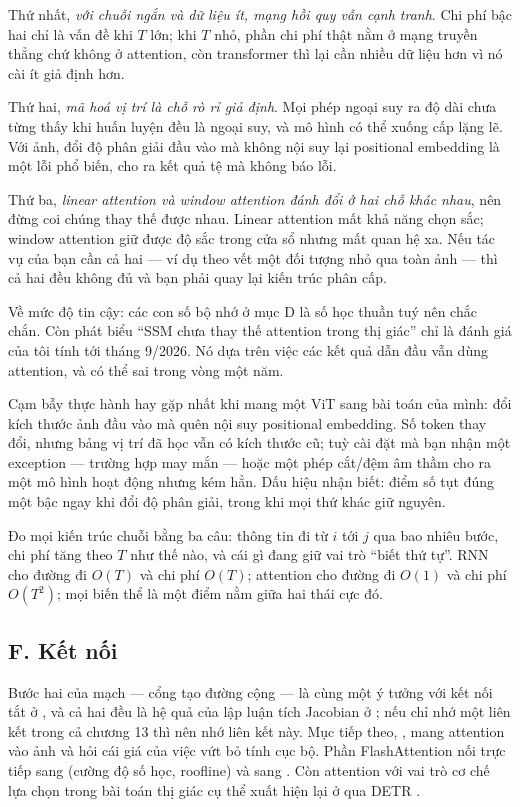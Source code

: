 \documentclass[../../../deep_learning.tex]{subfiles}
\begin{document}
Thứ nhất, \emph{với chuỗi ngắn và dữ liệu ít, mạng hồi quy vẫn cạnh tranh}. Chi phí bậc hai chỉ là vấn đề khi \(T\) lớn; khi \(T\) nhỏ, phần chi phí thật nằm ở mạng truyền thẳng chứ không ở attention, còn transformer thì lại cần nhiều dữ liệu hơn vì nó cài ít giả định hơn.

Thứ hai, \emph{mã hoá vị trí là chỗ rò rỉ giả định}. Mọi phép ngoại suy ra độ dài chưa từng thấy khi huấn luyện đều là ngoại suy, và mô hình có thể xuống cấp lặng lẽ. Với ảnh, đổi độ phân giải đầu vào mà không nội suy lại positional embedding là một lỗi phổ biến, cho ra kết quả tệ mà không báo lỗi.

Thứ ba, \emph{linear attention và window attention đánh đổi ở hai chỗ khác nhau}, nên đừng coi chúng thay thế được nhau. Linear attention mất khả năng chọn sắc; window attention giữ được độ sắc trong cửa sổ nhưng mất quan hệ xa. Nếu tác vụ của bạn cần cả hai --- ví dụ theo vết một đối tượng nhỏ qua toàn ảnh --- thì cả hai đều không đủ và bạn phải quay lại kiến trúc phân cấp.

Về mức độ tin cậy: các con số bộ nhớ ở mục D là số học thuần tuý nên chắc chắn. Còn phát biểu ``SSM chưa thay thế attention trong thị giác'' chỉ là đánh giá của tôi tính tới tháng 9/2026. Nó dựa trên việc các kết quả dẫn đầu vẫn dùng attention, và có thể sai trong vòng một năm.

\begin{cambay}
Cạm bẫy thực hành hay gặp nhất khi mang một ViT sang bài toán của mình: đổi kích thước ảnh đầu vào mà quên nội suy positional embedding. Số token thay đổi, nhưng bảng vị trí đã học vẫn có kích thước cũ; tuỳ cài đặt mà bạn nhận một exception --- trường hợp may mắn --- hoặc một phép cắt/đệm âm thầm cho ra một mô hình hoạt động nhưng kém hẳn. Dấu hiệu nhận biết: điểm số tụt đúng một bậc ngay khi đổi độ phân giải, trong khi mọi thứ khác giữ nguyên.
\end{cambay}

\begin{cannho}
Đo mọi kiến trúc chuỗi bằng ba câu: thông tin đi từ \(i\) tới \(j\) qua bao nhiêu bước, chi phí tăng theo \(T\) như thế nào, và cái gì đang giữ vai trò ``biết thứ tự''. RNN cho đường đi \(O(T)\) và chi phí \(O(T)\); attention cho đường đi \(O(1)\) và chi phí \(O(T^2)\); mọi biến thể là một điểm nằm giữa hai thái cực đó. 
\end{cannho}

\subsection{F. Kết nối}
Bước hai của mạch --- cổng tạo đường cộng --- là cùng một ý tưởng với kết nối tắt ở , và cả hai đều là hệ quả của lập luận tích Jacobian ở ; nếu chỉ nhớ một liên kết trong cả chương 13 thì nên nhớ liên kết này. Mục tiếp theo, , mang attention vào ảnh và hỏi cái giá của việc vứt bỏ tính cục bộ. Phần FlashAttention nối trực tiếp sang  (cường độ số học, roofline) và sang . Còn attention với vai trò cơ chế lựa chọn trong bài toán thị giác cụ thể xuất hiện lại ở  qua DETR \cite{carion2020detr}.
\end{document}
